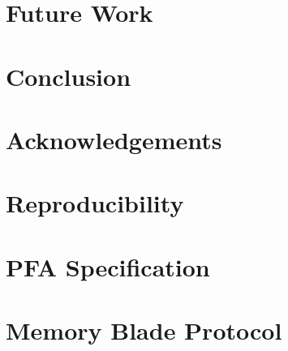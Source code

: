 \documentclass[12pt]{article}
\begin{document}
\section{Future Work} \label{sec:future}
    

\section{Conclusion} \label{sec:conclusion}
    

\section*{Acknowledgements}
  

\listoftodos

\clearpage
\begin{appendices}
  \section{Reproducibility} \label{apx:reproduce}
  
  \section{PFA Specification} \label{apx:pfa_spec}
  
  \section{Memory Blade Protocol} \label{apx:memblade_spec}
  
\end{appendices}

\clearpage
\printglossaries
\clearpage



\end{document}
